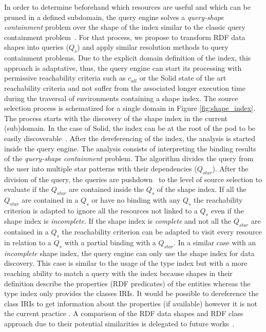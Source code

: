 In order to determine beforehand which resources are useful and which can be pruned in a defined subdomain, the query engine solves a \emph{query-shape containment} problem over the shape of the index similar to the classic query containment problem~\cite{afariQCE, Spasi2023}.
For that process, we propose to transform RDF data shapes into queries ($Q_{s}$) \cite{labragayo2017validating, Corman2019, Delva2021} and apply similar resolution methods to query containment problems.
Due to the explicit domain definition of the index, this approach is adaptative, 
thus, the query engine can start its processing with permissive reachability criteria
such as $c_{all}$ \cite{Hartig2012} or the Solid state of the art reachability criteria \cite{Taelman2023}
and not suffer from the associated longer execution time during the traversal of environments containing a shape index.
The source selection process is schematized for a single domain in Figure \ref{fig:shape_index}.
The process starts with the discovery of the shape index in the current (sub)domain.
In the case of Solid, the index can be at the root of the pod to be easily discoverable~.
After the dereferencing of the index, the analysis is started inside the query engine.
The analysis consists of interpreting the binding results of the \emph{query-shape containment} problem.
The algorithm divides the query from the user into multiple star patterns with their dependencies ($Q_{star}$).
After the division of the query, the queries are pushdown~\cite{Yang2021FlexPushdownDBHP} to the level of source selection to evaluate if the $Q_{star}$ are contained inside the $Q_s$ of the shape index.
If all the $Q_{star}$ are contained in a $Q_{s}$ or have no binding with any $Q_{s}$
the reachability criterion is adapted to ignore all the resources not linked to a $Q_{s}$ even if the shape index is \emph{incomplete}.
If the shape index is \emph{complete} and not all the $Q_{star}$ are contained in a $Q_{s}$ the reachability criterion can be adapted
to visit every resource in relation to a $Q_{s}$ with a partial binding with a $Q_{star}$.
In a similar case with an \emph{incomplete} shape index, the query engine can only use the shape index for data discovery.
This case is similar to the usage of the type index but with a more reaching ability to match a query with the index  because shapes in their definition describe the properties (RDF predicates) of the entities whereas the type index only provides the classes IRIs.
It would be possible to dereference the class IRIs to get information about the properties (if available) however it is not the current practice \cite{Taelman2023}.
A comparison of the RDF data shapes and RDF class approach due to their potential similarities is delegated to future works~.

